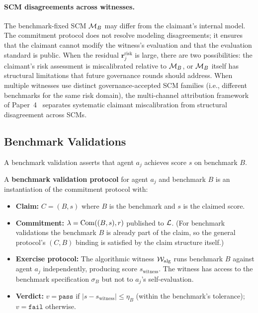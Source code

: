 \paragraph{SCM disagreements across witnesses.}
The benchmark-fixed SCM $\mathcal{M}_B$ may differ from the claimant's
internal model.  The commitment protocol does not resolve modeling
disagreements; it ensures that the claimant cannot modify the
witness's evaluation and that the evaluation standard is public.
When the residual $\mathbf{r}^{\mathrm{risk}}_j$ is large, there are
two possibilities: the claimant's risk assessment is miscalibrated
relative to $\mathcal{M}_B$, or $\mathcal{M}_B$ itself has structural limitations
that future governance rounds should address.  When multiple witnesses
use distinct governance-accepted SCM families (i.e., different
benchmarks for the same risk domain), the multi-channel attribution
framework of Paper~4~\citep{lasser2026scm} separates systematic
claimant miscalibration from structural disagreement across SCMs.

\subsection{Benchmark Validations}
\label{sec:benchmark_validations}

A benchmark validation asserts that agent $a_j$ achieves score $s$ on
benchmark $B$.

\begin{definition}
\label{def:benchmark_validation}
A \textbf{benchmark validation protocol} for agent $a_j$ and benchmark
$B$ is an instantiation of the commitment protocol with:
\begin{itemize}
    \item \textbf{Claim:} $C = (B, s)$ where $B$ is the benchmark and
    $s$ is the claimed score.
    \item \textbf{Commitment:} $\lambda = \mathrm{Com}((B, s), r)$ published
    to $\mathcal{L}$.  (For benchmark validations the benchmark $B$ is
    already part of the claim, so the general protocol's $(C, B)$
    binding is satisfied by the claim structure itself.)
    \item \textbf{Exercise protocol:} The algorithmic witness
    $\mathcal{W}_{\mathrm{alg}}$ runs benchmark $B$ against agent $a_j$
    independently, producing score $s_{\mathrm{witness}}$.  The witness
    has access to the benchmark specification $\sigma_B$ but not to
    $a_j$'s self-evaluation.
    \item \textbf{Verdict:} $v = \texttt{pass}$ if $|s -
    s_{\mathrm{witness}}| \leq \eta_B$ (within the benchmark's tolerance);
    $v = \texttt{fail}$ otherwise.
\end{itemize}
\end{definition}

